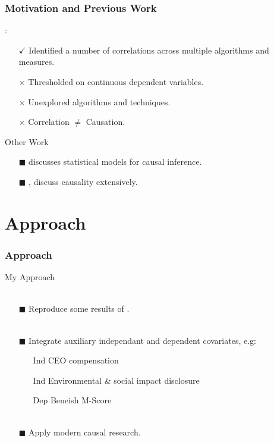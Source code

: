 \documentclass{beamer}
\begin{document}
\begin{frame}
\frametitle{Motivation and Previous Work}
\cite{moldovan2015learning}: 
\begin{itemize}
\item[$\checkmark$] Identified a number of correlations across multiple algorithms and measures. \\
\item [$\times$] Thresholded on continuous dependent variables. \\
\item [$\times$] Unexplored algorithms and techniques. \\
\item [$\times$] Correlation $\neq$ Causation.
\end{itemize}
\vspace{0.5cm}
Other Work
\begin{itemize}
\item[$\blacksquare$] \cite{holland1986statistics} discusses statistical models for causal inference. \\
\item [$\blacksquare$] \cite{pearl1995theory}, \cite{pearl2009causality} discuss causality extensively.
\end{itemize}
\end{frame}


\section{Approach}
\begin{frame}[t]
\frametitle{Approach}
My Approach \\~\\
\begin{enumerate}
\item [$\blacksquare$]  Reproduce some results of \cite{moldovan2015learning}. \\~\\
\item [$\blacksquare$]  Integrate auxiliary independant and dependent covariates, e.g: 
	\indent
	\begin{itemize} 
		\item [\footnotesize {Ind}] 		CEO compensation
		\item [\footnotesize {Ind}]		Environmental \& social impact disclosure
		\item [\footnotesize {Dep}]		Beneish M-Score  \\~\\ 
	\end{itemize}
\item [$\blacksquare$]  Apply modern causal research.
\end{enumerate}

\end{frame}
\end{document}
